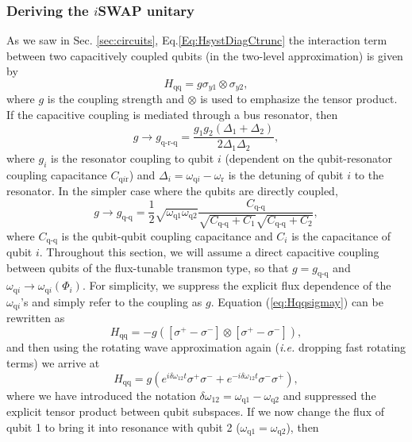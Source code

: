 \documentclass[aip,apr,twocolumn,showpacs,superscriptaddress,groupedaddress,nofootinbib,reprint]{revtex4-1}  %
\begin{document}
\subsubsection{Deriving the $i$\textsf{SWAP} unitary}
As we saw in Sec. \ref{sec:circuits}, Eq.\ref{Eq:HsystDiagCtrunc} the interaction term between two capacitively coupled qubits (in the two-level approximation) is given by
\begin{equation}
H_\text{qq} = g \sigma_{y1} \otimes \sigma_{y2}, \label{eq:Hqqsigmay}
\end{equation}
where $g$ is the coupling strength and $\otimes$ is used to emphasize  the tensor product. If the capacitive coupling is mediated through a bus resonator, then \cite{Blais2004,Majer2007}
\begin{equation}
g\rightarrow g_\text{q-r-q} = \frac{g_1g_2(\Delta_1+\Delta_2)}{2\Delta_1\Delta_2}, \label{eq:gqrq}
\end{equation}
where $g_i$ is the resonator coupling to qubit $i$ (dependent on the qubit-resonator coupling capacitance $C_{\text{q}i\text{r}}$) and $\Delta_i = \omega_{\text{q}i} - \omega_\text{r}$ is the detuning of qubit $i$ to the resonator. In the simpler case where the qubits are directly coupled\cite{Wendin2007},
\begin{equation}
g\rightarrow g_\text{q-q} = \frac{1}{2}\sqrt{\omega_{\text{q}1}\omega_{\text{q}2}}\frac{C_\text{q-q}}{\sqrt{C_\text{q-q}+C_1}\sqrt{C_\text{q-q}+C_2}}, \label{eq:gqq}
\end{equation}
where $C_\text{q-q}$ is the qubit-qubit coupling capacitance and $C_i$ is the capacitance of qubit $i$. Throughout this section, we will assume a direct capacitive coupling between qubits of the flux-tunable transmon type, so that $g = g_\text{q-q}$ and $\omega_{\text{q}i} \rightarrow \omega_{\text{q}i}(\Phi_i)$. For simplicity, we suppress the explicit flux dependence of the $\omega_{\text{q}i}$'s and simply refer to the coupling as $g$. Equation (\ref{eq:Hqqsigmay}) can be rewritten as
\begin{equation}
H_\text{qq} = -g\left([\sigma^+ - \sigma^-]\otimes[\sigma^+ - \sigma^-]\right),
\end{equation}
and then using the rotating wave approximation again (\emph{i.e.} dropping fast rotating terms) we arrive at
\begin{equation}
H_\text{qq} = g\left(e^{i\delta\omega_{12}t}\sigma^+\sigma^- + e^{-i\delta\omega_{12}t}\sigma^-\sigma^+\right),
\end{equation}
where we have introduced the notation $\delta \omega_{12} = \omega_{\text{q}1} - \omega_{\text{q}2}$ and suppressed the explicit tensor product between qubit subspaces. If we now change the flux of qubit 1 to bring it into resonance with qubit 2 ($\omega_{\text{q}1} = \omega_{\text{q}2}$), then
\end{document}
